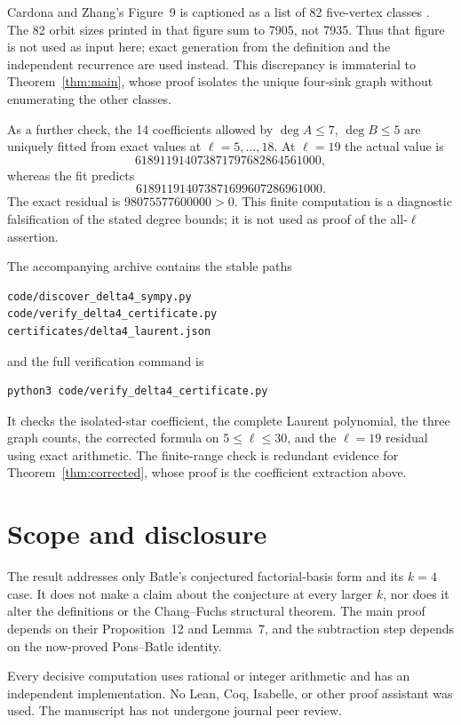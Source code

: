 \documentclass[11pt]{amsart}
\theoremstyle{definition}
\begin{document}
Cardona and Zhang's Figure~9 is captioned as a list of 82 five-vertex classes
\cite{CardonaZhang2020}.  The 82 orbit sizes printed in that figure sum to
7905, not 7935.  Thus that figure is not used as input here; exact generation
from the definition and the independent recurrence are used instead.  This
discrepancy is immaterial to Theorem~\ref{thm:main}, whose proof isolates the
unique four-sink graph without enumerating the other classes.

As a further check, the 14 coefficients allowed by
$\deg A\le7$, $\deg B\le5$ are uniquely fitted from exact values at
$\ell=5,\dots,18$.  At $\ell=19$ the actual value is
\[
618911914073871797682864561000,
\]
whereas the fit predicts
\[
618911914073871699607286961000.
\]
The exact residual is $98075577600000>0$.  This finite computation is a
diagnostic falsification of the stated degree bounds; it is not used as proof
of the all-$\ell$ assertion.

The accompanying archive contains the stable paths
\begin{verbatim}
code/discover_delta4_sympy.py
code/verify_delta4_certificate.py
certificates/delta4_laurent.json
\end{verbatim}
and the full verification command is
\begin{verbatim}
python3 code/verify_delta4_certificate.py
\end{verbatim}
It checks the isolated-star coefficient, the complete Laurent polynomial, the
three graph counts, the corrected formula on $5\le\ell\le30$, and the
$\ell=19$ residual using exact arithmetic.  The finite-range check is redundant
evidence for Theorem~\ref{thm:corrected}, whose proof is the coefficient
extraction above.

\section{Scope and disclosure}

The result addresses only Batle's conjectured factorial-basis form and its
$k=4$ case.  It does not make a claim about the conjecture at every larger
$k$, nor does it alter the definitions or the Chang--Fuchs structural theorem.
The main proof depends on their Proposition~12 and Lemma~7, and the subtraction
step depends on the now-proved Pons--Batle identity.

Every decisive computation uses rational or integer arithmetic and has an
independent implementation.  No Lean, Coq, Isabelle, or other proof assistant
was used.  The manuscript has not undergone journal peer review.


\begingroup
\sloppy

\endgroup
\end{document}
